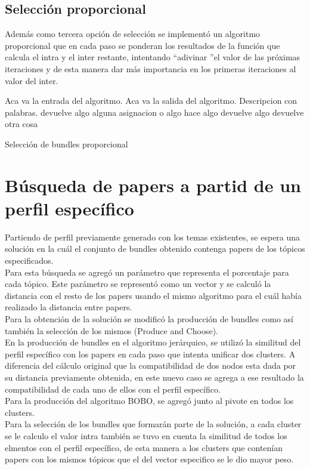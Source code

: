 \subsection{Selección proporcional}
Además como tercera opción de selección se implementó un algoritmo proporcional que en cada paso se 
ponderan los resultados de la función que calcula el intra y el inter restante, intentando 
\textquotedblleft adivinar \textquotedblright el valor de las próximas iteraciones y de esta manera 
dar más importancia en los primeras iteraciones al valor del inter.
\begin{algorithm}
\begin{algorithmic}[1]
\REQUIRE Aca va la entrada del algoritmo.
\ENSURE Aca va la salida del algoritmo.
\STATE Descripcion con palabras.
\RETURN devuelve algo
\ELSE
\STATE alguna asignacion o algo
\ENDIF
\ENDWHILE
{}
\STATE hace algo
\RETURN devuelve algo
\ENDIF
\ENDFOR
\RETURN devuelve otra cosa
\end{algorithmic}
\caption{Selección de bundles proporcional}\label{alg:algSelProp}
\end{algorithm}

\section{Búsqueda de papers a partid de un perfil específico}
Partiendo de perfil previamente generado con los temas existentes, se espera una solución en la 
cuál el conjunto de bundles obtenido contenga papers de los tópicos especificados. \\
Para esta búsqueda se agregó un parámetro que representa el porcentaje para cada tópico. Este 
parámetro se representó como un vector y se calculó la distancia con el resto de los papers usando 
el mismo algoritmo para el cuál había realizado la distancia entre papers. \\
Para la obtención de la solución se modificó la producción de bundles como así también la 
selección de los mismos (Produce and Choose). \\
En la producción de bundles en el algoritmo jerárquico, se utilizó la similitud del perfil 
específico con los papers en cada paso que intenta unificar dos clusters. A diferencia del cálculo 
original que la compatibilidad de dos nodos esta dada por su distancia previamente obtenida, en 
este nuevo caso se agrega a ese resultado la compatibilidad de cada uno de ellos con el perfil 
específico. \\
Para la producción del algoritmo BOBO, se agregó junto al pivote en todos los clusters. \\
Para la selección de los bundles que formarán parte de la solución, a cada cluster se le 
calculo el valor intra también se tuvo en cuenta la similitud de todos los elmentos con el perfil  
específico, de esta manera a los clusters que contenían papers con los mismos tópicos que el del 
vector especifico se le dio mayor peso.


